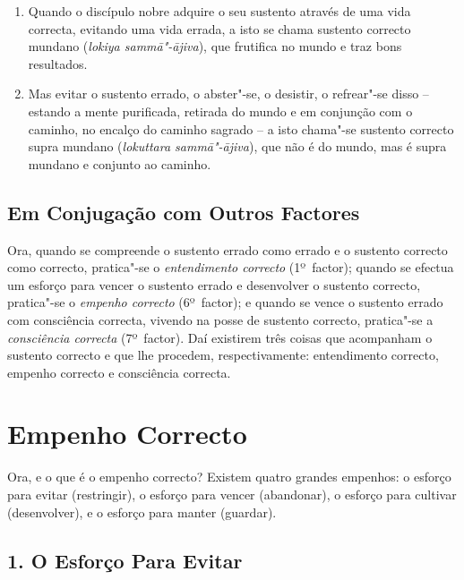 \begin{enumerate}

  \item Quando o discípulo nobre adquire o seu sustento através de uma vida
        correcta, evitando uma vida errada, a isto se chama sustento correcto
        mundano (\emph{lokiya sammā"-ājiva}), que frutifica no mundo e traz bons
        resultados.

  \item Mas evitar o sustento errado, o abster"-se, o desistir, o refrear"-se
        disso -- estando a mente purificada, retirada do mundo e em conjunção
        com o caminho, no encalço do caminho sagrado -- a isto chama"-se sustento
        correcto supra mundano (\emph{lokuttara sammā"-ājiva}), que não é do
        mundo, mas é supra mundano e conjunto ao caminho.

\end{enumerate}

\subsection{Em Conjugação com Outros Factores}

Ora, quando se compreende o sustento errado como errado e o sustento correcto
como correcto, pratica"-se o \emph{entendimento correcto} (1º~factor); quando se
efectua um esforço para vencer o sustento errado e desenvolver o sustento
correcto, pratica"-se o \emph{empenho correcto} (6º~factor); e quando se vence o
sustento errado com consciência correcta, vivendo na posse de sustento correcto,
pratica"-se a \emph{consciência correcta} (7º~factor). Daí existirem três coisas
que acompanham o sustento correcto e que lhe procedem, respectivamente:
entendimento correcto, empenho correcto e consciência correcta.


\section{Empenho Correcto}



Ora, e o que é o empenho correcto? Existem quatro grandes empenhos: o esforço
para evitar (restringir), o esforço para vencer (abandonar), o esforço para cultivar (desenvolver), e o
esforço para manter (guardar).

\subsection{1. O Esforço Para Evitar}

